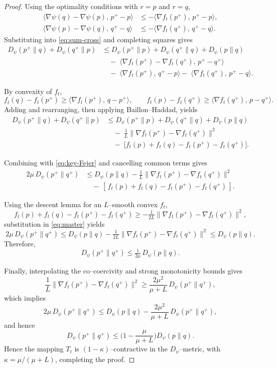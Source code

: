 \documentclass[11pt]{article}
\theoremstyle{plain}
\theoremstyle{definition}
\theoremstyle{remark}
\begin{document}
\begin{proof}
Using the optimality conditions with $r=p$ and $r=q$,
\begin{align}\tag*{}
\langle\nabla\psi(q)-\nabla\psi(p),\,p^+-p\rangle
&\le -\langle\nabla f_t(p^+),\,p^+-p\rangle,\\
\langle\nabla\psi(p)-\nabla\psi(q),\,q^+-q\rangle
&\le -\langle\nabla f_t(q^+),\,q^+-q\rangle.
\end{align}
Substituting into \eqref{eq:sum-cross} and completing squares gives
\begin{equation}\tag*{}
\begin{aligned}
D_\psi(p^+\|q)+D_\psi(q^+\|p)
&\le D_\psi(p^+\|p)+D_\psi(q^+\|q)+D_\psi(p\|q)\\
&\quad-\;\langle\nabla f_t(p^+)-\nabla f_t(q^+),\,p^+-q^+\rangle\\
&\quad-\;\langle\nabla f_t(p^+),\,q^+-p\rangle
-\;\langle\nabla f_t(q^+),\,p^+-q\rangle .
\end{aligned}
\end{equation}

By convexity of $f_t$,
\[
f_t(q)-f_t(p^+)\ge\langle\nabla f_t(p^+),\,q-p^+\rangle,\qquad
f_t(p)-f_t(q^+)\ge\langle\nabla f_t(q^+),\,p-q^+\rangle.
\]
Adding and rearranging, then applying Baillon–Haddad, yields
\begin{equation}\tag*{}
\begin{aligned}
D_\psi(p^+\|q)+D_\psi(q^+\|p)
&\le D_\psi(p^+\|p)+D_\psi(q^+\|q)+D_\psi(p\|q)\\
&\quad-\;\frac{1}{L}\|\nabla f_t(p^+)-\nabla f_t(q^+)\|^2\\
&\quad-\;\big[f_t(p)+f_t(q)-f_t(p^+)-f_t(q^+)\big].
\end{aligned}
\end{equation}

Combining with \eqref{eq:key-Fejer} and cancelling common terms gives
\begin{equation}\label{eq:master}
\begin{aligned}
2\mu\,D_\psi(p^+\|q^+)
&\le D_\psi(p\|q)
-\frac{1}{L}\|\nabla f_t(p^+)-\nabla f_t(q^+)\|^2\\
&\quad-\,[\,f_t(p)+f_t(q)-f_t(p^+)-f_t(q^+)\,].
\end{aligned}
\end{equation}

Using the descent lemma for an $L$–smooth convex $f_t$,
\[
f_t(p)+f_t(q)-f_t(p^+)-f_t(q^+)
\ge -\tfrac{1}{2L}\|\nabla f_t(p^+)-\nabla f_t(q^+)\|^2,
\]
substitution in \eqref{eq:master} yields
\[
2\mu\,D_\psi(p^+\|q^+)
\le D_\psi(p\|q) - \tfrac{1}{2L}\|\nabla f_t(p^+)-\nabla f_t(q^+)\|^2
\le D_\psi(p\|q).
\]
Therefore,
\[
D_\psi(p^+\|q^+)\le \tfrac{1}{2\mu}\,D_\psi(p\|q).
\]

Finally, interpolating the co–coercivity and strong monotonicity bounds gives
\[
\frac{1}{L}\|\nabla f_t(p^+)-\nabla f_t(q^+)\|^2
\ge \frac{2\mu^2}{\mu+L}\,D_\psi(p^+\|q^+),
\]
which implies
\[
2\mu\,D_\psi(p^+\|q^+)
\le D_\psi(p\|q)-\frac{2\mu^2}{\mu+L}\,D_\psi(p^+\|q^+),
\]
and hence
\[
D_\psi(p^+\|q^+)\le\Big(1-\frac{\mu}{\mu+L}\Big)D_\psi(p\|q).
\]
Hence the mapping $T_t$ is $(1-\kappa)$–contractive in the $D_\psi$–metric,
with $\kappa=\mu/(\mu+L)$, completing the proof.
\end{proof}
\end{document}
